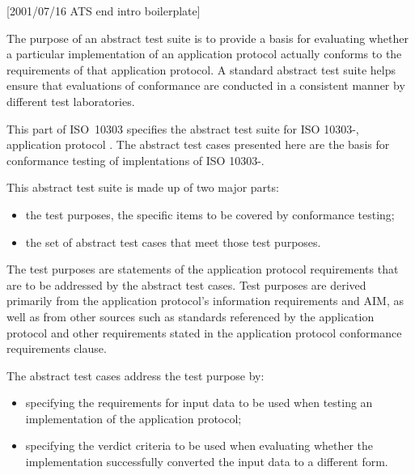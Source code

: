 [2001/07/16 ATS end intro boilerplate]

The purpose of an abstract test suite is to provide a basis for
evaluating whether a particular implementation of an application
protocol actually conforms to the requirements of that application
protocol. A standard abstract test suite helps ensure that
evaluations of conformance are conducted in a consistent manner
by different test laboratories.

This part of ISO~10303 specifies the abstract test suite for
ISO 10303-\theAPpartno, application protocol \theAPtitle.
The abstract test cases presented here are the basis for
conformance testing of implentations of ISO 10303-\theAPpartno.

    This abstract test suite is made up of two major parts:
\begin{itemize}
\item the test purposes, the specific items to be covered by
      conformance testing;
\item the set of abstract test cases that meet those test purposes.
\end{itemize}

    The test purposes are statements of the application protocol
requirements that are to be addressed by the abstract test cases.
Test purposes are derived primarily from the application protocol's
information requirements and AIM,
as well as from other sources such as standards
referenced by the application protocol and other requirements
stated in the application protocol conformance requirements clause.

    The abstract test cases address the test purpose by:
\begin{itemize}
\item specifying the requirements for input data to be used when
      testing an implementation of the application protocol;
\item specifying the verdict criteria to be used when evaluating
      whether the implementation successfully converted the input
      data to a different form.
\end{itemize}

